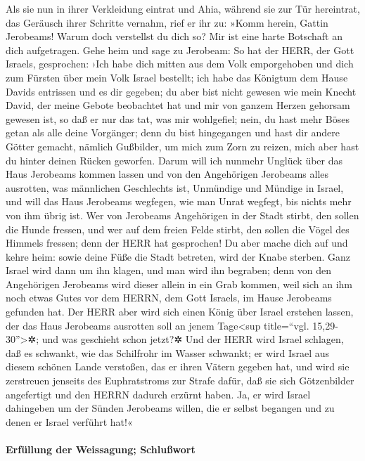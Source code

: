 Als sie nun in ihrer Verkleidung eintrat und Ahia, während
sie zur Tür hereintrat, das Geräusch ihrer Schritte vernahm, rief er ihr
zu: »Komm herein, Gattin Jerobeams! Warum doch verstellst du dich so?
Mir ist eine harte Botschaft an dich aufgetragen. Gehe
heim und sage zu Jerobeam: So hat der HERR, der Gott Israels,
gesprochen: ›Ich habe dich mitten aus dem Volk emporgehoben und dich zum
Fürsten über mein Volk Israel bestellt; ich habe das
Königtum dem Hause Davids entrissen und es dir gegeben; du aber bist
nicht gewesen wie mein Knecht David, der meine Gebote beobachtet hat und
mir von ganzem Herzen gehorsam gewesen ist, so daß er nur das tat, was
mir wohlgefiel; nein, du hast mehr Böses getan als alle
deine Vorgänger; denn du bist hingegangen und hast dir andere Götter
gemacht, nämlich Gußbilder, um mich zum Zorn zu reizen, mich aber hast
du hinter deinen Rücken geworfen. Darum will ich nunmehr
Unglück über das Haus Jerobeams kommen lassen und von den Angehörigen
Jerobeams alles ausrotten, was männlichen Geschlechts ist, Unmündige und
Mündige in Israel, und will das Haus Jerobeams wegfegen, wie man Unrat
wegfegt, bis nichts mehr von ihm übrig ist. Wer von
Jerobeams Angehörigen in der Stadt stirbt, den sollen die Hunde fressen,
und wer auf dem freien Felde stirbt, den sollen die Vögel des Himmels
fressen; denn der HERR hat gesprochen! Du aber mache dich
auf und kehre heim: sowie deine Füße die Stadt betreten, wird der Knabe
sterben. Ganz Israel wird dann um ihn klagen, und man
wird ihn begraben; denn von den Angehörigen Jerobeams wird dieser allein
in ein Grab kommen, weil sich an ihm noch etwas Gutes vor dem HERRN, dem
Gott Israels, im Hause Jerobeams gefunden hat. Der HERR
aber wird sich einen König über Israel erstehen lassen, der das Haus
Jerobeams ausrotten soll an jenem Tage\textless sup title=``vgl.
15,29-30''\textgreater✲; und was geschieht schon jetzt?✲
Und der HERR wird Israel schlagen, daß es schwankt, wie
das Schilfrohr im Wasser schwankt; er wird Israel aus diesem schönen
Lande verstoßen, das er ihren Vätern gegeben hat, und wird sie
zerstreuen jenseits des Euphratstroms zur Strafe dafür, daß sie sich
Götzenbilder angefertigt und den HERRN dadurch erzürnt haben.
Ja, er wird Israel dahingeben um der Sünden Jerobeams
willen, die er selbst begangen und zu denen er Israel verführt hat!«

\hypertarget{erfuxfcllung-der-weissagung-schluuxdfwort}{%
\paragraph{Erfüllung der Weissagung;
Schlußwort}\label{erfuxfcllung-der-weissagung-schluuxdfwort}}

